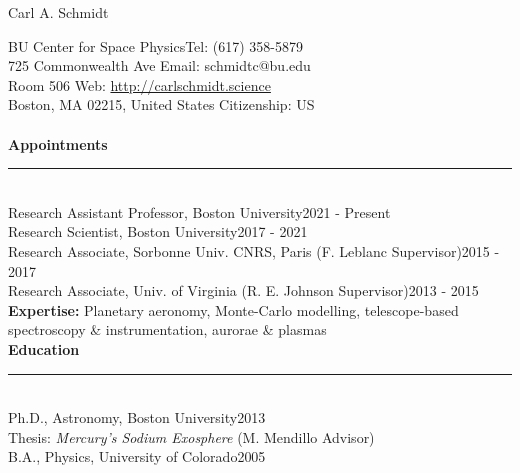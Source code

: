\documentclass[12pt]{report}
\begin{document}
\newpage  
{\noindent}{\Large Carl A. Schmidt} \\ %
%
%

%
\thispagestyle{myheadings}

\noindent BU Center for Space Physics\hfill Tel: (617) 358-5879\\
725 Commonwealth Ave \hfill Email: schmidtc@bu.edu\\
Room 506 \hfill Web: \url{http://carlschmidt.science}\\
Boston, MA 02215, United States \hfill Citizenship: US\\
\vspace{2 mm}\\
\bf{Appointments}\rm\\
\rule{\textwidth}{1pt}\\
\noindent Research Assistant Professor, Boston University\hfill 2021 - Present\\
\noindent Research Scientist, Boston University\hfill 2017 - 2021\\
\noindent Research Associate, Sorbonne Univ. CNRS, Paris (F. Leblanc Supervisor)\hfill 2015 - 2017\\
\noindent Research Associate, Univ. of Virginia (R. E. Johnson Supervisor)\hfill 2013 - 2015\\


\vspace{1 mm}
\noindent \textbf{Expertise:} Planetary aeronomy, Monte-Carlo modelling, telescope-based spectroscopy \& instrumentation, aurorae \& plasmas\\

\vspace{2 mm}
\noindent \bf{Education}\rm \hspace*{\fill} \\
\rule{\textwidth}{1pt}\\
\noindent Ph.D., Astronomy, Boston University\hfill 2013\\
\indent Thesis: {\it Mercury's Sodium Exosphere} (M. Mendillo Advisor)\\
\noindent B.A., Physics, University of Colorado\hfill 2005\\
\end{document}
